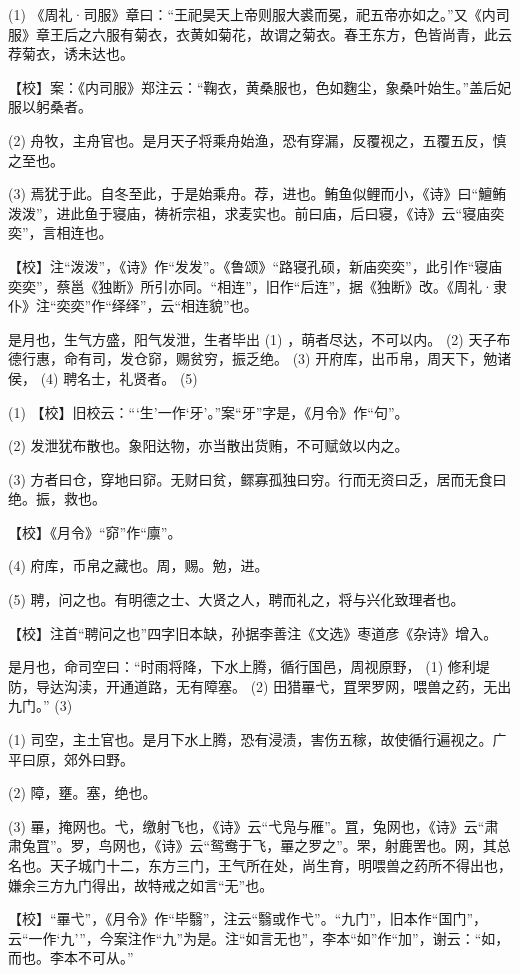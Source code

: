 \documentclass[12pt,UTF8]{ctexbook}
\begin{document}
(1) 《周礼·司服》章曰：“王祀昊天上帝则服大裘而冕，祀五帝亦如之。”又《内司服》章王后之六服有菊衣，衣黄如菊花，故谓之菊衣。春王东方，色皆尚青，此云荐菊衣，诱未达也。

【校】案：《内司服》郑注云：“鞠衣，黄桑服也，色如麴尘，象桑叶始生。”盖后妃服以躬桑者。

(2) 舟牧，主舟官也。是月天子将乘舟始渔，恐有穿漏，反覆视之，五覆五反，慎之至也。

(3) 焉犹于此。自冬至此，于是始乘舟。荐，进也。鲔鱼似鲤而小，《诗》曰“鱣鲔泼泼”，进此鱼于寝庙，祷祈宗祖，求麦实也。前曰庙，后曰寝，《诗》云“寝庙奕奕”，言相连也。

【校】注“泼泼”，《诗》作“发发”。《鲁颂》“路寝孔硕，新庙奕奕”，此引作“寝庙奕奕”，蔡邕《独断》所引亦同。“相连”，旧作“后连”，据《独断》改。《周礼·隶仆》注“奕奕”作“绎绎”，云“相连貌”也。

是月也，生气方盛，阳气发泄，生者毕出 (1) ，萌者尽达，不可以内。 (2) 天子布德行惠，命有司，发仓窌，赐贫穷，振乏绝。 (3) 开府库，出币帛，周天下，勉诸侯， (4) 聘名士，礼贤者。 (5)

(1) 【校】旧校云：“‘生’一作‘牙’。”案“牙”字是，《月令》作“句”。

(2) 发泄犹布散也。象阳达物，亦当散出货贿，不可赋敛以内之。

(3) 方者曰仓，穿地曰窌。无财曰贫，鳏寡孤独曰穷。行而无资曰乏，居而无食曰绝。振，救也。

【校】《月令》“窌”作“廪”。

(4) 府库，币帛之藏也。周，赐。勉，进。

(5) 聘，问之也。有明德之士、大贤之人，聘而礼之，将与兴化致理者也。

【校】注首“聘问之也”四字旧本缺，孙据李善注《文选》枣道彦《杂诗》增入。

是月也，命司空曰：“时雨将降，下水上腾，循行国邑，周视原野， (1) 修利堤防，导达沟渎，开通道路，无有障塞。 (2) 田猎罼弋，罝罘罗网，喂兽之药，无出九门。” (3)

(1) 司空，主土官也。是月下水上腾，恐有浸渍，害伤五稼，故使循行遍视之。广平曰原，郊外曰野。

(2) 障，壅。塞，绝也。

(3) 罼，掩网也。弋，缴射飞也，《诗》云“弋凫与雁”。罝，兔网也，《诗》云“肃肃兔罝”。罗，鸟网也，《诗》云“鸳鸯于飞，罼之罗之”。罘，射鹿罟也。网，其总名也。天子城门十二，东方三门，王气所在处，尚生育，明喂兽之药所不得出也，嫌余三方九门得出，故特戒之如言“无”也。

【校】“罼弋”，《月令》作“毕翳”，注云“翳或作弋”。“九门”，旧本作“国门”，云“一作‘九’”，今案注作“九”为是。注“如言无也”，李本“如”作“加”，谢云：“如，而也。李本不可从。”
\end{document}
